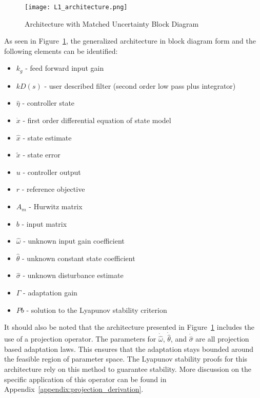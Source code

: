 \begin{figure}[h!]
 \centering
  \texttt{[image: L1\_architecture.png]}
  \caption{\Lone Architecture with Matched Uncertainty Block Diagram \cite{hovakimyan2010l1} }
  \label{fig:l1_architecture}
\end{figure}

As seen in Figure~\ref{fig:l1_architecture}, the generalized \Lone architecture in block diagram form and the following elements can be identified:
\begin{itemize}
	\item[] $k_g$ - feed forward input gain
	\item[] $kD(s)$ - user described filter (second order low pass plus integrator)
	\item[] $\hat{\eta}$ - \Lone controller state
	\item[] $\dot{x}$ - first order differential equation of state model
	\item[] $\hat{x}$ - state estimate
	\item[] $\tilde{x}$ - state error
	\item[] $u$ - controller output
	\item[] $r$ - reference objective
	\item[] $A_m$ - Hurwitz matrix
	\item[] $b$ - input matrix
	\item[] $\hat{\omega}$ - unknown input gain coefficient
	\item[] $\hat{\theta}$ - unknown constant state coefficient
	\item[] $\hat{\sigma}$ - unknown disturbance estimate
	\item[] $\Gamma$ - adaptation gain
	\item[] $Pb$ - solution to the Lyapunov stability criterion	
\end{itemize}

It should also be noted that the architecture presented in Figure~\ref{fig:l1_architecture} includes the use of a projection operator.  The parameters for $\dot{\hat{\omega}}$, $\dot{\hat{\theta}}$, and $\dot{\hat{\sigma}}$ are all projection based adaptation laws.  This ensures that the adaptation stays bounded around the feasible region of parameter space.  The Lyapunov stability proofs for this architecture rely on this method to guarantee stability\cite{hovakimyan2010l1}.  More discussion on the specific application of this operator can be found in Appendix~\ref{appendix:projection_derivation}.

